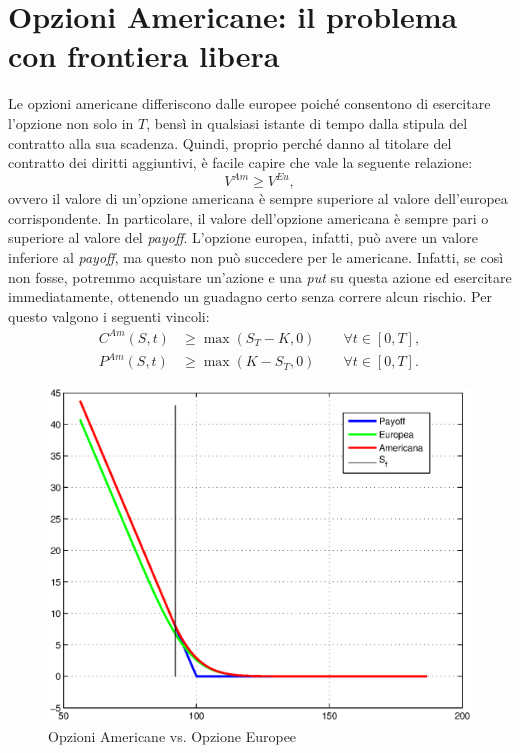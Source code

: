 \documentclass[a4paper,10pt]{report}
\theoremstyle{plain}
\theoremstyle{definition}
\theoremstyle{remark}
\begin{document}
\section{Opzioni Americane: il problema con frontiera libera}
Le opzioni americane differiscono dalle europee poich\'e consentono di esercitare l'opzione non solo in $T$, bens\`i in qualsiasi istante di tempo dalla stipula del contratto alla sua scadenza. Quindi, proprio perch\'e danno al titolare del contratto dei diritti aggiuntivi, \`e facile capire che vale la seguente relazione: $$V^{Am}\geq V^{Eu},$$ ovvero il valore di un'opzione americana \`e sempre superiore al valore dell'europea corrispondente. In particolare, il valore dell'opzione americana \`e sempre pari o superiore al valore del \emph{payoff}. L'opzione europea, infatti, pu\`o avere un valore inferiore al \emph{payoff}, ma questo non pu\`o succedere per le americane. Infatti, se cos\`i non fosse, potremmo acquistare un'azione e una \emph{put} su questa azione ed esercitare immediatamente, ottenendo un guadagno certo senza correre alcun rischio. Per questo valgono i seguenti vincoli:
\begin{align}
C^{Am}(S,t)&\geq \max(S_T-K,0)\qquad\forall t\in[0,T],\\
P^{Am}(S,t)&\geq \max(K-S_T,0)\qquad\forall t\in[0,T].
\label{putbound}
\end{align}
\begin{figure}[h!]
\begin{center}
\includegraphics[width=12cm]{img/putam.eps}
\caption{Opzioni Americane vs. Opzione Europee}
\label{putamfig}
\end{center}
\end{figure}
\end{document}
